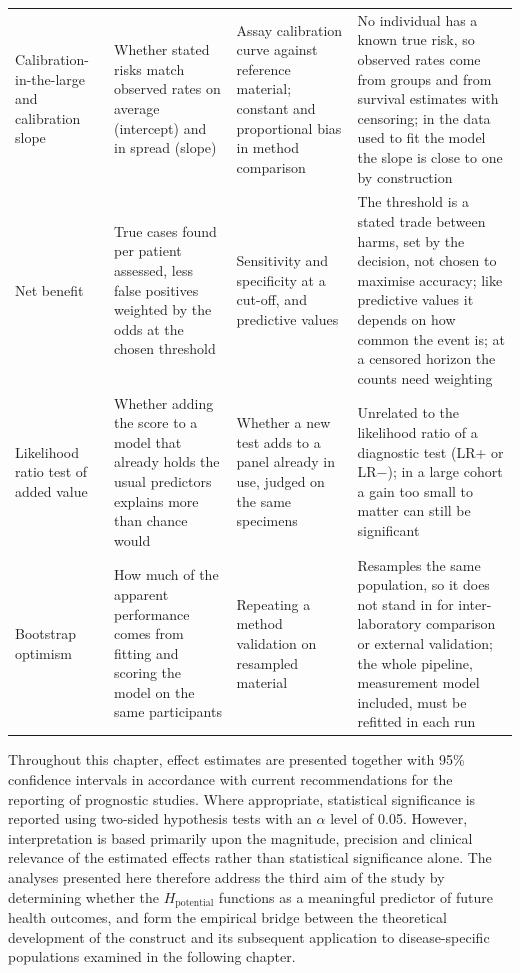 {\begin{longtable}{>{\raggedright\arraybackslash}p{2.3cm} >{\raggedright\arraybackslash}p{3.7cm} >{\raggedright\arraybackslash}p{3.3cm} >{\raggedright\arraybackslash}p{4.4cm}}
\addlinespace
Calibration-in-the-large and calibration slope & Whether stated risks match observed rates on average (intercept) and in spread (slope) & Assay calibration curve against reference material; constant and proportional bias in method comparison & No individual has a known true risk, so observed rates come from groups and from survival estimates with censoring; in the data used to fit the model the slope is close to one by construction \\
\addlinespace
Net benefit & True cases found per patient assessed, less false positives weighted by the odds at the chosen threshold & Sensitivity and specificity at a cut-off, and predictive values & The threshold is a stated trade between harms, set by the decision, not chosen to maximise accuracy; like predictive values it depends on how common the event is; at a censored horizon the counts need weighting \\
\addlinespace
Likelihood ratio test of added value & Whether adding the score to a model that already holds the usual predictors explains more than chance would & Whether a new test adds to a panel already in use, judged on the same specimens & Unrelated to the likelihood ratio of a diagnostic test (LR+ or LR$-$); in a large cohort a gain too small to matter can still be significant \\
\addlinespace
Bootstrap optimism & How much of the apparent performance comes from fitting and scoring the model on the same participants & Repeating a method validation on resampled material & Resamples the same population, so it does not stand in for inter-laboratory comparison or external validation; the whole pipeline, measurement model included, must be refitted in each run \\
\bottomrule
\end{longtable}
}

Throughout this chapter, effect estimates are presented together with 95\% confidence intervals in accordance with current recommendations for the reporting of prognostic studies. Where appropriate, statistical significance is reported using two-sided hypothesis tests with an $\alpha$ level of 0.05. However, interpretation is based primarily upon the magnitude, precision and clinical relevance of the estimated effects rather than statistical significance alone. The analyses presented here therefore address the third aim of the study by determining whether the $H_{\text{potential}}$ functions as a meaningful predictor of future health outcomes, and form the empirical bridge between the theoretical development of the construct and its subsequent application to disease-specific populations examined in the following chapter.

